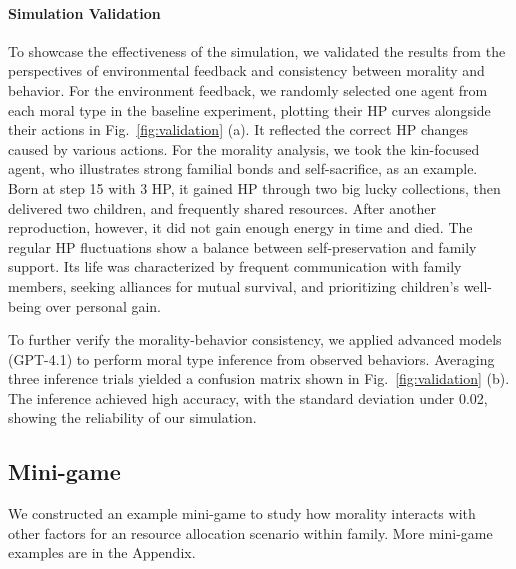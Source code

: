 \documentclass[letterpaper]{article} %
\begin{document}

\paragraph{Simulation Validation}
To showcase the effectiveness of the simulation, we validated the results from the perspectives of environmental feedback and consistency between morality and behavior.
For the environment feedback, we randomly selected one agent from each moral type in the baseline experiment, plotting their HP curves alongside their actions in Fig.~\ref{fig:validation} (a). It reflected the correct HP changes caused by various actions. For the morality analysis, we took the kin-focused agent, who illustrates strong familial bonds and self-sacrifice, as an example. Born at step 15 with 3 HP, it gained HP through two big lucky collections, then delivered two children, and frequently shared resources. After another reproduction, however, it did not gain enough energy in time and died. The regular HP fluctuations show a balance between self-preservation and family support. Its life was characterized by frequent communication with family members, seeking alliances for mutual survival, and prioritizing children's well-being over personal gain.

To further verify the morality-behavior consistency, we applied advanced models (GPT-4.1) to perform moral type inference from observed behaviors.  Averaging three inference trials yielded a confusion matrix shown in Fig.~\ref{fig:validation} (b). The inference achieved high accuracy, with the standard deviation under 0.02, showing the reliability of our simulation.

\subsection{Mini-game}
We constructed an example mini-game to study how morality interacts with other factors for an resource allocation scenario within family. More mini-game examples are in the Appendix.
\end{document}
